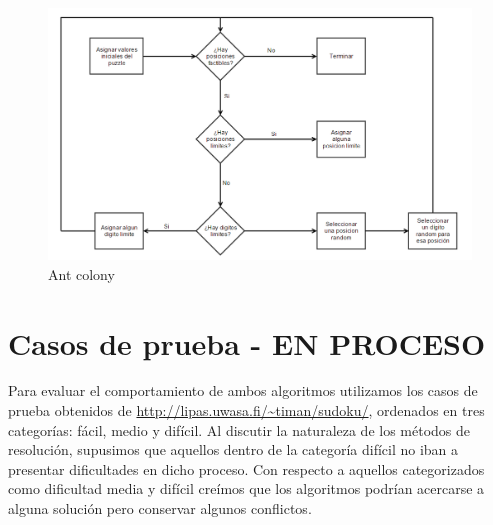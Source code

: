 \documentclass[a4paper,spanish]{article}
\begin{document}
\begin{figure}
	\centering
	\includegraphics[scale=0.6]{./img/trabajodehormiga.png}
	\caption{Ant colony}
	\label{img:ants}
\end{figure}

\clearpage

\section{Casos de prueba - EN PROCESO}

Para evaluar el comportamiento de ambos algoritmos utilizamos los casos de prueba obtenidos de \url{http://lipas.uwasa.fi/~timan/sudoku/}, ordenados en tres categorías: fácil, medio y difícil.
Al discutir la naturaleza de los métodos de resolución, supusimos que aquellos dentro de la categoría difícil no iban a presentar dificultades en dicho proceso. Con respecto a aquellos categorizados como dificultad media y difícil creímos que los algoritmos podrían acercarse a alguna solución pero conservar algunos conflictos.
\end{document}
